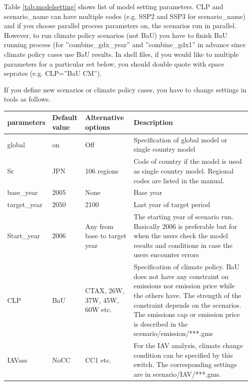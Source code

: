 \documentclass[10pt,a4paper,titlepage,dvipdfmx]{book}
\begin{document}
Table \ref{tab:modelsetting} shows list of model setting parameters. CLP and scenario\_name can have multiple codes (e.g. SSP2 and SSP3 for scenario\_name) and if you choose parallel process parameters on, the scenarios run in parallel. However, to run climate policy scenarios (not BaU) you have to finish BaU running process (for ''combine\_gdx\_year'' and ''combine\_gdx1'' in advance since climate policy cases use BaU results. In shell files, if you would like to multiple parameters for a particular set below, you should double quote with space seprates (e.g. CLP=''BaU CM'').

If you define new scenarios or climate policy cases, you have to change settings in tools as follows.


\begin{tabularx}{\textwidth}{|
p{}|
p{}|
p{}|
p{}|} 
\caption{model setting parameters\label{tab:modelsetting}} \\
\hline 
parameters & Default value & Alternative options & Description \\\hline 
global & on & Off & Specification of global model or single country model \\\hline 
Sr & JPN & 106 regions & Code of country if the model is used as single country model. Regional codes are listed in the manual. \\\hline 
base\_year & 2005 & None & Base year \\\hline 
target\_year & 2050 & 2100 & Last year of target period \\\hline 
Start\_year & 2006 & Any from base to target year & The starting year of scenario run. Basically 2006 is preferable but for when the users check the model results and conditions in case the users encounter errors \\\hline 
CLP & BaU & CTAX, 26W, 37W, 45W, 60W etc. & Specification of climate policy. BaU does not have any constraint on emissions nor emission price while the others have. The strength of the constraint depends on the scenarios. The emissions cap or emission price is described in the scenario/emission/***.gms \\\hline 
IAVass & NoCC & CC1 etc. & For the IAV analysis, climate change condition can be specified by this switch. The corresponding settings are in scenario/IAV/***.gms. \\\hline 

\end{tabularx}
\end{document}
